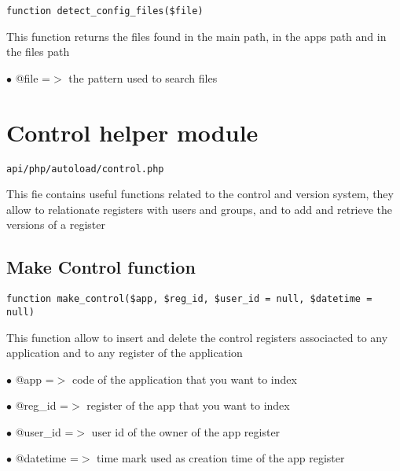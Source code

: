 \documentclass[a4paper]{book}
\begin{document}
\begin{lstlisting}
function detect_config_files($file)
\end{lstlisting}

This function returns the files found in the main path, in the apps path and in the files path

\begin{compactitem}
\item[\color{myblue}$\bullet$] @file =$>$ the pattern used to search files
\end{compactitem}

\hypertarget{toc58}{}
\section{Control helper module}

\begin{lstlisting}
api/php/autoload/control.php
\end{lstlisting}

This fie contains useful functions related to the control and version system, they allow to
relationate registers with users and groups, and to add and retrieve the versions of a register

\hypertarget{toc59}{}
\subsection{Make Control function}

\begin{lstlisting}
function make_control($app, $reg_id, $user_id = null, $datetime = null)
\end{lstlisting}

This function allow to insert and delete the control registers associacted
to any application and to any register of the application

\begin{compactitem}
\item[\color{myblue}$\bullet$] @app      =$>$ code of the application that you want to index
\item[\color{myblue}$\bullet$] @reg\_id   =$>$ register of the app that you want to index
\item[\color{myblue}$\bullet$] @user\_id  =$>$ user id of the owner of the app register
\item[\color{myblue}$\bullet$] @datetime =$>$ time mark used as creation time of the app register
\end{compactitem}
\end{document}
